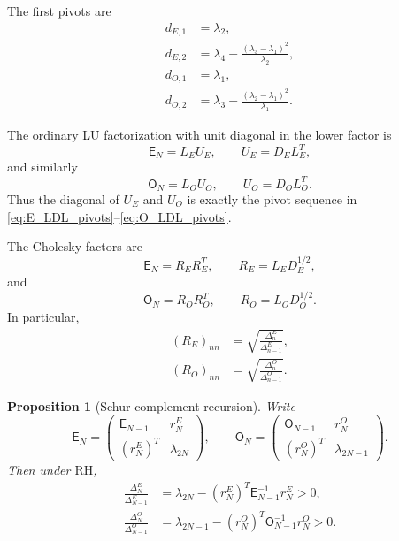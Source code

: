 \documentclass[11pt]{amsart}
\numberwithin{equation}{section}
\theoremstyle{plain}
\newtheorem{proposition}[theorem]{Proposition}
\theoremstyle{definition}
\theoremstyle{remark}
\newcommand{\RH}{\mathrm{RH}}
\newcommand{\E}{\mathsf E}
\newcommand{\Omat}{\mathsf O}
\begin{document}
The first pivots are
\begin{align}
d_{E,1}&=\lambda_2,
\label{eq:E_first_pivot}\\
d_{E,2}&=\lambda_4-
\frac{(\lambda_3-\lambda_1)^2}{\lambda_2},
\label{eq:E_second_pivot}\\
d_{O,1}&=\lambda_1,
\label{eq:O_first_pivot}\\
d_{O,2}&=\lambda_3-
\frac{(\lambda_2-\lambda_1)^2}{\lambda_1}.
\label{eq:O_second_pivot}
\end{align}

The ordinary LU factorization with unit diagonal in the lower factor is
\begin{equation}
\E_N=L_EU_E,
\qquad U_E=D_EL_E^T,
\label{eq:E_LU}
\end{equation}
and similarly
\begin{equation}
\Omat_N=L_OU_O,
\qquad U_O=D_OL_O^T.
\label{eq:O_LU}
\end{equation}
Thus the diagonal of $U_E$ and $U_O$ is exactly the pivot sequence in \eqref{eq:E_LDL_pivots}--\eqref{eq:O_LDL_pivots}.

The Cholesky factors are
\begin{equation}
\E_N=R_ER_E^T,
\qquad R_E=L_ED_E^{1/2},
\label{eq:E_cholesky}
\end{equation}
and
\begin{equation}
\Omat_N=R_OR_O^T,
\qquad R_O=L_OD_O^{1/2}.
\label{eq:O_cholesky}
\end{equation}
In particular,
\begin{align}
(R_E)_{nn}&=\sqrt{\frac{\Delta_n^E}{\Delta_{n-1}^E}},
\label{eq:E_cholesky_diagonal}\\
(R_O)_{nn}&=\sqrt{\frac{\Delta_n^O}{\Delta_{n-1}^O}}.
\label{eq:O_cholesky_diagonal}
\end{align}

\begin{proposition}[Schur-complement recursion]
\label{prop:schur_recursion}
Write
\begin{equation}
\E_N=
\begin{pmatrix}
\E_{N-1}&r_N^E\\
(r_N^E)^T&\lambda_{2N}
\end{pmatrix},
\qquad
\Omat_N=
\begin{pmatrix}
\Omat_{N-1}&r_N^O\\
(r_N^O)^T&\lambda_{2N-1}
\end{pmatrix}.
\label{eq:block_decomposition}
\end{equation}
Then under $\RH$,
\begin{align}
\frac{\Delta_N^E}{\Delta_{N-1}^E}
&=\lambda_{2N}-(r_N^E)^T\E_{N-1}^{-1}r_N^E>0,
\label{eq:E_schur_complement}\\
\frac{\Delta_N^O}{\Delta_{N-1}^O}
&=\lambda_{2N-1}-(r_N^O)^T\Omat_{N-1}^{-1}r_N^O>0.
\label{eq:O_schur_complement}
\end{align}
\end{proposition}
\end{document}
